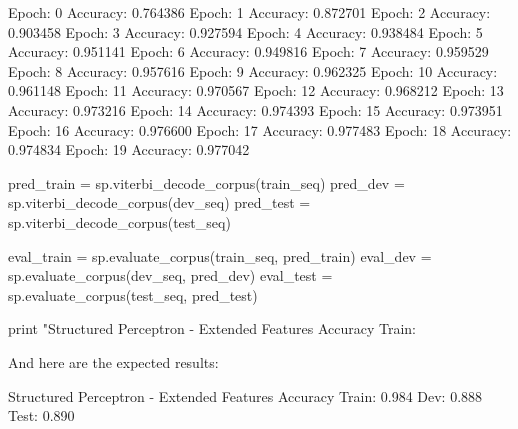 \begin{exercise}
\begin{python}
Epoch: 0 Accuracy: 0.764386
Epoch: 1 Accuracy: 0.872701
Epoch: 2 Accuracy: 0.903458
Epoch: 3 Accuracy: 0.927594
Epoch: 4 Accuracy: 0.938484
Epoch: 5 Accuracy: 0.951141
Epoch: 6 Accuracy: 0.949816
Epoch: 7 Accuracy: 0.959529
Epoch: 8 Accuracy: 0.957616
Epoch: 9 Accuracy: 0.962325
Epoch: 10 Accuracy: 0.961148
Epoch: 11 Accuracy: 0.970567
Epoch: 12 Accuracy: 0.968212
Epoch: 13 Accuracy: 0.973216
Epoch: 14 Accuracy: 0.974393
Epoch: 15 Accuracy: 0.973951
Epoch: 16 Accuracy: 0.976600
Epoch: 17 Accuracy: 0.977483
Epoch: 18 Accuracy: 0.974834
Epoch: 19 Accuracy: 0.977042

pred_train = sp.viterbi_decode_corpus(train_seq)
pred_dev = sp.viterbi_decode_corpus(dev_seq)
pred_test = sp.viterbi_decode_corpus(test_seq)

eval_train = sp.evaluate_corpus(train_seq, pred_train)
eval_dev = sp.evaluate_corpus(dev_seq, pred_dev)
eval_test = sp.evaluate_corpus(test_seq, pred_test)

print "Structured Perceptron - Extended Features Accuracy Train: %
\end{python}

And here are the expected results:
\begin{python}
Structured Perceptron - Extended Features Accuracy Train: 0.984 Dev: 0.888 Test: 0.890
\end{python}

\end{exercise}





